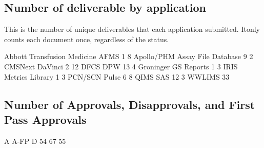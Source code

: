 \documentclass{article}
\begin{document}
\subsection{Number of deliverable by application}
This is the number of unique deliverables that each application submitted. Itonly counts
each document once, regardless of the status.
\begin{Schunk}
\begin{Soutput}
Abbott Transfusion Medicine                        AFMS 
                          1                           8 
                 Apollo/PHM         Assay File Database 
                          9                           2 
                    CMSNext                     DaVinci 
                          2                          12 
                       DFCS                         DPW 
                         13                           4 
                  Groninger                  GS Reports 
                          1                           3 
                       IRIS             Metrics Library 
                          1                           3 
                    PCN/SCN                       Pulse 
                          6                           8 
                       QIMS                         SAS 
                         12                           3 
                     WWLIMS 
                         33 
\end{Soutput}
\end{Schunk}

\subsection{Number of Approvals, Disapprovals, and First Pass Approvals}

\begin{Schunk}
\begin{Soutput}
   A A-FP    D 
  54   67   55 
\end{Soutput}
\end{Schunk}
\end{document}
